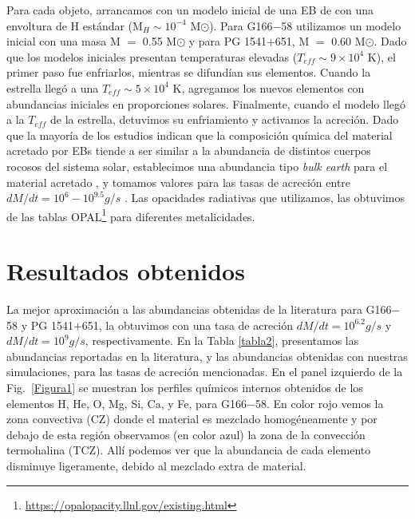 \documentclass[baaa]{baaa}
\begin{document}
Para cada objeto, arrancamos con un modelo inicial de una EB de \cite{2010ApJ...717..183R} con una envoltura de H estándar (M$_H \sim 10^{-4}$ M$\odot$). Para G166$-$58 utilizamos un modelo inicial con una masa M $=$ 0.55 M$\odot$ y para PG 1541$+$651, M $=$ 0.60 M$\odot$. Dado que los modelos iniciales presentan temperaturas elevadas ($T_{eff} \sim 9 \times 10^4$ K), el primer paso fue enfriarlos, mientras se difundían sus elementos. Cuando la estrella llegó a una $T_{eff} \sim 5 \times 10^4$ K, agregamos los nuevos elementos con abundancias iniciales en proporciones solares. Finalmente, cuando el modelo llegó a la $T_{eff}$ de la estrella, detuvimos su enfriamiento y activamos la acreción. Dado que la mayoría de los estudios indican que la composición química del material acretado por EBs tiende a ser similar a la abundancia de distintos cuerpos rocosos del sistema solar, establecimos una abundancia tipo {\em bulk earth} para el material acretado \citep{2001E&PSL.185...49A}, y tomamos valores para las tasas de acreción entre $dM/dt = 10^6 - 10^{9.5} g/s$ \citep[ver][]{2022A&A...660A..30W}. Las opacidades radiativas que utilizamos, las obtuvimos de las tablas OPAL\footnote{\url{https://opalopacity.llnl.gov/existing.html}} para diferentes metalicidades.

\section{Resultados obtenidos}
La mejor aproximación a las abundancias obtenidas de la literatura para G166$-$58 y PG 1541$+$651, la obtuvimos con una tasa de acreción $dM/dt = 10^{6.2} g/s$ y $dM/dt = 10^9 g/s$, respectivamente. En la Tabla \ref{tabla2}, presentamos las abundancias reportadas en la literatura, y las abundancias obtenidas con nuestras simulaciones, para las tasas de acreción mencionadas. En el panel izquierdo de la Fig.~\ref{Figura1} se muestran los perfiles químicos internos obtenidos de los elementos H, He, O, Mg, Si, Ca, y Fe, para G166$-$58. En color rojo vemos la zona convectiva (CZ) donde el material es mezclado homogéneamente y por debajo de esta región observamos (en color azul) la zona de la convección termohalina (TCZ). Allí podemos ver que la abundancia de cada elemento disminuye ligeramente, debido al mezclado extra de material. 
\end{document}
